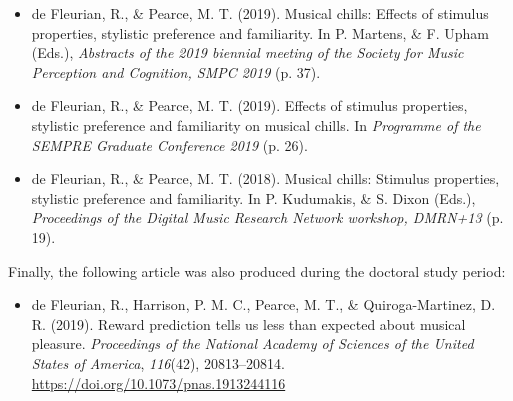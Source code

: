 \begin{itemize}
\item de Fleurian, R., \& Pearce, M. T. (2019). Musical chills: Effects of stimulus properties, stylistic preference and familiarity. In P. Martens, \& F. Upham (Eds.), \emph{Abstracts of the 2019 biennial meeting of the Society for Music Perception and Cognition, SMPC 2019} (p. 37). 
\item de Fleurian, R., \& Pearce, M. T. (2019). Effects of stimulus properties, stylistic preference and familiarity on musical chills. In \emph{Programme of the SEMPRE Graduate Conference 2019} (p. 26). 
\item de Fleurian, R., \& Pearce, M. T. (2018). Musical chills: Stimulus properties, stylistic preference and familiarity. In P. Kudumakis, \& S. Dixon (Eds.), \emph{Proceedings of the Digital Music Research Network workshop, DMRN+13} (p. 19). 
\end{itemize}

\noindent Finally, the following article was also produced during the doctoral study period:

\begin{itemize}
\item de Fleurian, R., Harrison, P. M. C., Pearce, M. T., \& Quiroga-Martinez, D. R. (2019). Reward prediction tells us less than expected about musical pleasure. \emph{Proceedings of the National Academy of Sciences of the United States of America}, \emph{116}(42), 20813--20814. \url{https://doi.org/10.1073/pnas.1913244116}
\end{itemize}
